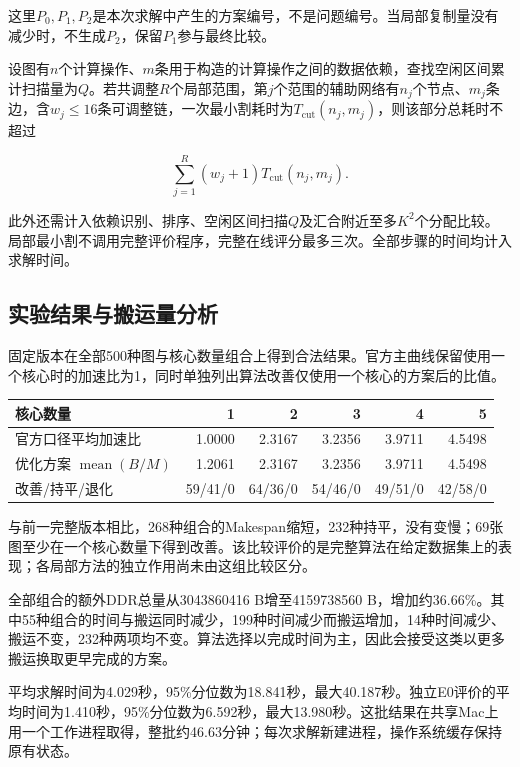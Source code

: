 \documentclass[anonymous,notoc]{gmcm2026}
\begin{document}
这里\(P_0,P_1,P_2\)是本次求解中产生的方案编号，不是问题编号。当局部复制量没有减少时，不生成\(P_2\)，保留\(P_1\)参与最终比较。

设图有\(n\)个计算操作、\(m\)条用于构造的计算操作之间的数据依赖，查找空闲区间累计扫描量为\(Q\)。若共调整\(R\)个局部范围，第\(j\)个范围的辅助网络有\(n_j\)个节点、\(m_j\)条边，含\(w_j\le16\)条可调整链，一次最小割耗时为\(T_{\mathrm{cut}}(n_j,m_j)\)，则该部分总耗时不超过

\[\sum_{j=1}^{R}(w_j+1)T_{\mathrm{cut}}(n_j,m_j).\]

此外还需计入依赖识别、排序、空闲区间扫描\(Q\)及汇合附近至多\(K^2\)个分配比较。局部最小割不调用完整评价程序，完整在线评分最多三次。全部步骤的时间均计入求解时间。

\subsection{实验结果与搬运量分析}

固定版本在全部500种图与核心数量组合上得到合法结果。官方主曲线保留使用一个核心时的加速比为1，同时单独列出算法改善仅使用一个核心的方案后的比值。

\begin{table}[!htbp]\centering\small
\begin{tabularx}{\linewidth}{@{}Xrrrrr@{}}\toprule
核心数量 & 1 & 2 & 3 & 4 & 5 \\
\midrule
官方口径平均加速比 & 1.0000 & 2.3167 & 3.2356 & 3.9711 & 4.5498 \\
优化方案 $\operatorname{mean}(B/M)$ & 1.2061 & 2.3167 & 3.2356 & 3.9711 & 4.5498 \\
改善/持平/退化 & 59/41/0 & 64/36/0 & 54/46/0 & 49/51/0 & 42/58/0 \\
\bottomrule\end{tabularx}\end{table}

与前一完整版本相比，268种组合的Makespan缩短，232种持平，没有变慢；69张图至少在一个核心数量下得到改善。该比较评价的是完整算法在给定数据集上的表现；各局部方法的独立作用尚未由这组比较区分。

全部组合的额外DDR总量从3043860416 B增至4159738560 B，增加约36.66\%。其中55种组合的时间与搬运同时减少，199种时间减少而搬运增加，14种时间减少、搬运不变，232种两项均不变。算法选择以完成时间为主，因此会接受这类以更多搬运换取更早完成的方案。

平均求解时间为4.029秒，95\%分位数为18.841秒，最大40.187秒。独立E0评价的平均时间为1.410秒，95\%分位数为6.592秒，最大13.980秒。这批结果在共享Mac上用一个工作进程取得，整批约46.63分钟；每次求解新建进程，操作系统缓存保持原有状态。
\end{document}
